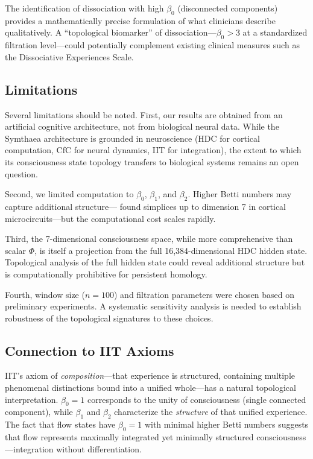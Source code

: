 \documentclass[11pt,a4paper]{article}
\begin{document}
The identification of dissociation with high $\beta_0$ (disconnected components) provides a mathematically precise formulation of what clinicians describe qualitatively.
A ``topological biomarker'' of dissociation---$\beta_0 > 3$ at a standardized filtration level---could potentially complement existing clinical measures such as the Dissociative Experiences Scale.

\subsection{Limitations}

Several limitations should be noted.
First, our results are obtained from an artificial cognitive architecture, not from biological neural data.
While the Symthaea architecture is grounded in neuroscience (HDC for cortical computation, CfC for neural dynamics, IIT for integration), the extent to which its consciousness state topology transfers to biological systems remains an open question.

Second, we limited computation to $\beta_0$, $\beta_1$, and $\beta_2$.
Higher Betti numbers may capture additional structure---\citet{reimann2017cliques} found simplices up to dimension 7 in cortical microcircuits---but the computational cost scales rapidly.

Third, the 7-dimensional consciousness space, while more comprehensive than scalar $\Phi$, is itself a projection from the full 16,384-dimensional HDC hidden state.
Topological analysis of the full hidden state could reveal additional structure but is computationally prohibitive for persistent homology.

Fourth, window size ($n = 100$) and filtration parameters were chosen based on preliminary experiments.
A systematic sensitivity analysis is needed to establish robustness of the topological signatures to these choices.

\subsection{Connection to IIT Axioms}

IIT's axiom of \emph{composition}---that experience is structured, containing multiple phenomenal distinctions bound into a unified whole---has a natural topological interpretation.
$\beta_0 = 1$ corresponds to the unity of consciousness (single connected component), while $\beta_1$ and $\beta_2$ characterize the \emph{structure} of that unified experience.
The fact that flow states have $\beta_0 = 1$ with minimal higher Betti numbers suggests that flow represents maximally integrated yet minimally structured consciousness---integration without differentiation.
\end{document}
